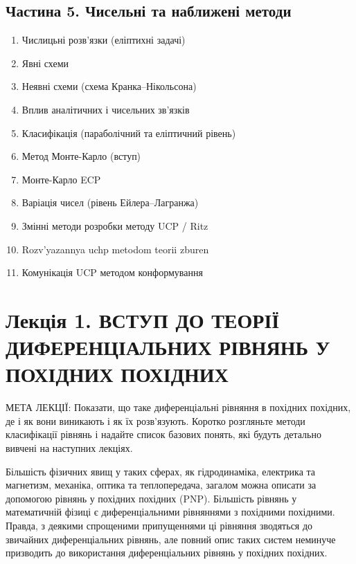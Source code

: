 \documentclass[
  ukrainian,
]{article}
\providecommand{\tightlist}{%
  \setlength{\itemsep}{0pt}\setlength{\parskip}{0pt}}
\begin{document}
\subsection{Частина 5. Чисельні та наближені
методи}\label{ux447ux430ux441ux442ux438ux43dux430-5.-ux447ux438ux441ux435ux43bux44cux43dux456-ux442ux430-ux43dux430ux431ux43bux438ux436ux435ux43dux456-ux43cux435ux442ux43eux434ux438}

\begin{enumerate}
\def\labelenumi{\arabic{enumi}.}
\setcounter{enumi}{36}
\tightlist
\item
  Числицьні розв'язки (еліптихні задачі)
\item
  Явні схеми
\item
  Неявні схеми (схема Кранка--Нікольсона)
\item
  Вплив аналітичних і чисельних зв'язків
\item
  Класифікація (параболічний та еліптичний рівень)
\item
  Метод Монте-Карло (вступ)
\item
  Монте-Карло ECP
\item
  Варіація чисел (рівень Ейлера--Лагранжа)
\item
  Змінні методи розробки методу UCP / Ritz
\item
  Rozv'yazannya uchp metodom teorii zburen
\item
  Комунікація UCP методом конформування
\end{enumerate}

\section{Лекція 1. ВСТУП ДО ТЕОРІЇ ДИФЕРЕНЦІАЛЬНИХ РІВНЯНЬ У ПОХІДНИХ
ПОХІДНИХ}\label{ux43bux435ux43aux446ux456ux44f-1.-ux432ux441ux442ux443ux43f-ux434ux43e-ux442ux435ux43eux440ux456ux457-ux434ux438ux444ux435ux440ux435ux43dux446ux456ux430ux43bux44cux43dux438ux445-ux440ux456ux432ux43dux44fux43dux44c-ux443-ux43fux43eux445ux456ux434ux43dux438ux445-ux43fux43eux445ux456ux434ux43dux438ux445}

МЕТА ЛЕКЦІЇ: Показати, що таке диференціальні рівняння в похідних
похідних, де і як вони виникають і як їх розв'язують. Коротко розгляньте
методи класифікації рівнянь і надайте список базових понять, які будуть
детально вивчені на наступних лекціях.

Більшість фізичних явищ у таких сферах, як гідродинаміка, електрика та
магнетизм, механіка, оптика та теплопередача, загалом можна описати за
допомогою рівнянь у похідних похідних (PNP). Більшість рівнянь у
математичній фізиці є диференціальними рівняннями з похідними похідними.
Правда, з деякими спрощеними припущеннями ці рівняння зводяться до
звичайних диференціальних рівнянь, але повний опис таких систем неминуче
призводить до використання диференціальних рівнянь у похідних похідних.
\end{document}
